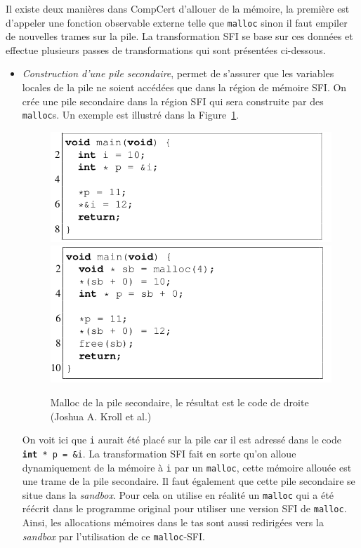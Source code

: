 \documentclass[11pt]{sdm}
\begin{document}
Il existe deux manières dans CompCert d'allouer de la mémoire, la première est d'appeler une fonction observable externe telle que \texttt{malloc} sinon il faut empiler de nouvelles trames sur la pile.
La transformation SFI se base sur ces données et effectue plusieurs passes de transformations qui sont présentées ci-dessous.

\begin{itemize}
	\item \textit{Construction d'une pile secondaire}, permet de s'assurer que les variables locales de la pile ne soient accédées que dans la région de mémoire SFI. On crée une pile secondaire dans la région SFI qui sera construite par des \texttt{malloc}s. Un exemple est illustré dans la Figure~\ref{shadow_stack}.
	
	
\begin{figure}[b]
\centering
\includegraphics[scale=0.33]{images/before_shadow.png}
\includegraphics[scale=0.33]{images/after_shadow.png}
\caption{Malloc de la pile secondaire, le résultat est le code de droite (Joshua A. Kroll et al.)}
\label{shadow_stack}
\end{figure}


On voit ici que \texttt{i} aurait été placé sur la pile car il est adressé dans le code \texttt{\textbf{int}~*~p~=~\&i}. La transformation SFI fait en sorte qu'on alloue dynamiquement de la mémoire à \texttt{i} par un \texttt{malloc}, cette mémoire allouée est une trame de la pile secondaire. Il faut également que cette pile secondaire se situe dans la \textit{sandbox}. Pour cela on utilise en réalité un \texttt{malloc} qui a été réécrit dans le programme original pour utiliser une version SFI de \texttt{malloc}. Ainsi, les allocations mémoires dans le tas sont aussi redirigées vers la \textit{sandbox} par l'utilisation de ce \texttt{malloc}-SFI.


\end{itemize}
\end{document}
